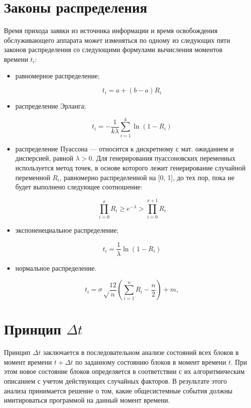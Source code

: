 \chapter{Законы распределения}

Время прихода заявки из источника информации и время освобождения обслуживающего аппарата может изменяться по одному из следующих пяти законов распределения со следующими формулами вычисления моментов времени $t_i$:
\begin{itemize}
	\item равномерное распределение;
	
	\begin{equation}
		t_i = a + (b - a)R_i
	\end{equation}
	
	\item распределение Эрланга;
	
	\begin{equation}
		t_i = -\frac{1}{k\lambda} \sum_{i=1}^{k} \ln(1 - R_i)
	\end{equation}
	
	\item распределение Пуассона --- относится к дискретному с мат. ожиданием и дисперсией, равной $\lambda > 0$. 
	Для генерирования пуассоновских переменных используется метод точек, в основе которого лежит генерирование случайной переменной $R_i$, равномерно распределенной на [0, 1], до тех пор, пока не будет выполнено следующее соотношение:
	
	\begin{equation}
		\prod_{i=0}^{x} R_i \ge e^{-\lambda} > \prod_{i=0}^{x+1} R_i
	\end{equation}
	
	\item экспоненециальное распределение;
	
	\begin{equation}
		t_i = \frac{1}{\lambda} \ln(1 - R_i)
	\end{equation}
	
	\item нормальное распределение.
	
	\begin{equation}
		t_i = \sigma \sqrt\frac{12}{n}(\sum\limits_{i=1}^{n} R_i - \frac{n}{2}) + m,
	\end{equation}
	
\end{itemize}


\chapter{Принцип $\Delta t$}
Принцип $\Delta t$ заключается в последовательном анализе состояний всех блоков в момент времени $t + \Delta t$ по заданному состоянию блоков в момент времени $t$. 
При этом новое состояние блоков определяется в соответствии с их алгоритмическим описанием с учетом действующих случайных факторов. 
В результате этого анализа принимается решение о том, какие общесистемные события должны имитироваться программой на данный момент времени.

